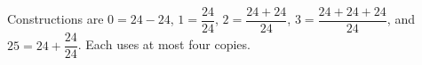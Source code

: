 Constructions are $0=24-24$, $1=\dfrac{24}{24}$, $2=\dfrac{24+24}{24}$, $3=\dfrac{24+24+24}{24}$, and $25=24+\dfrac{24}{24}$. Each uses at most four copies.
